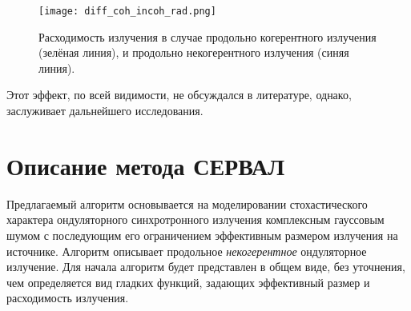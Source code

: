 \begin{figure}[H] 
	\centering 	\texttt{[image: diff\_coh\_incoh\_rad.png]}
	\caption{Расходимость излучения в случае продольно когерентного излучения (зелёная линия), и продольно некогерентного излучения (синяя линия).}
	\label{fig:diff_coh_incoh_rad}
\end{figure}
\noindent Этот эффект, по всей видимости, не обсуждался в литературе, однако, заслуживает дальнейшего исследования.
\section{Описание метода СЕРВАЛ}
Предлагаемый алгоритм основывается на моделировании стохастического характера ондуляторного синхротронного излучения комплексным гауссовым шумом с последующим его ограничением эффективным размером излучения на источнике. Алгоритм описывает продольное \textit{некогерентное} ондуляторное излучение. Для начала алгоритм будет представлен в общем виде, без уточнения, чем определяется вид гладких функций, задающих эффективный размер и расходимость излучения. 
